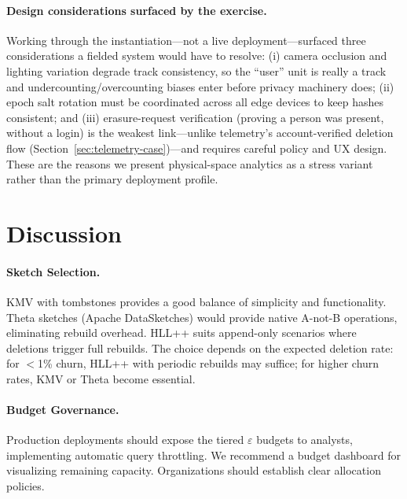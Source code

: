 \documentclass[sigconf,anonymous,review]{acmart}
\begin{document}
\paragraph{Design considerations surfaced by the exercise.} Working through the instantiation---not a live deployment---surfaced three considerations a fielded system would have to resolve: (i) camera occlusion and lighting variation degrade track consistency, so the ``user'' unit is really a track and undercounting/overcounting biases enter before privacy machinery does; (ii) epoch salt rotation must be coordinated across all edge devices to keep hashes consistent; and (iii) erasure-request verification (proving a person was present, without a login) is the weakest link---unlike telemetry's account-verified deletion flow (Section~\ref{sec:telemetry-case})---and requires careful policy and UX design. These are the reasons we present physical-space analytics as a stress variant rather than the primary deployment profile.

\section{Discussion}

\paragraph{Sketch Selection.} KMV with tombstones provides a good balance of simplicity and functionality. Theta sketches (Apache DataSketches) would provide native A-not-B operations, eliminating rebuild overhead. HLL++ suits append-only scenarios where deletions trigger full rebuilds. The choice depends on the expected deletion rate: for $<$1\% churn, HLL++ with periodic rebuilds may suffice; for higher churn rates, KMV or Theta become essential.

\paragraph{Budget Governance.} Production deployments should expose the tiered $\varepsilon$ budgets to analysts, implementing automatic query throttling. We recommend a budget dashboard for visualizing remaining capacity. Organizations should establish clear allocation policies.
\end{document}
